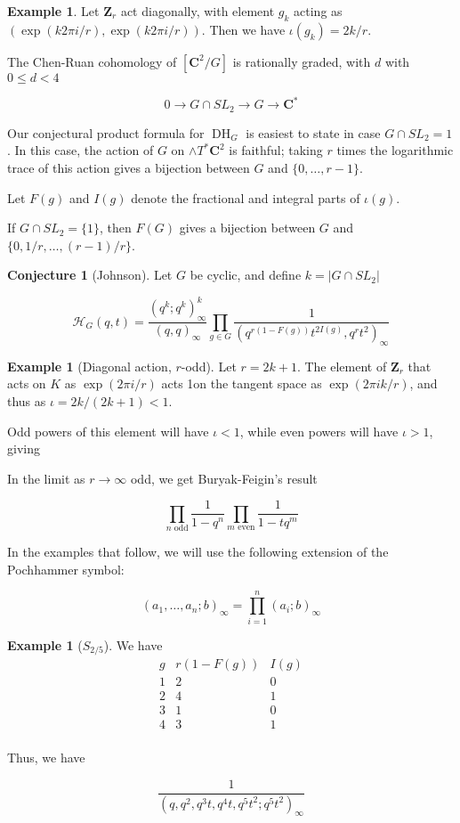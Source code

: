 \documentclass{amsart}[12pt]
\theoremstyle{definition}
\newtheorem{example}[dummy]{Example}
\newtheorem{conjecture}[dummy]{Conjecture}
\newcommand{\Z}{\mathbf{Z}}
\newcommand{\C}{\mathbf{C}}
\DeclareMathOperator{\DC}{DH}
\begin{document}
\begin{example}
Let $\Z_r$ act diagonally, with element $g_k$ acting as $(\exp(k2\pi i/r),\exp(k2\pi i/r))$.  Then we have $\iota(g_k)=2k/r$.
\end{example}




The Chen-Ruan cohomology of $[\C^2/G]$ is rationally graded, with $d$ with $0\leq d < 4$


$$0\to G\cap SL_2\to G \to \C^*$$








Our conjectural product formula for $\DC_G$ is easiest to state in case $G\cap SL_2=1$.  In this case, the action of $G$ on $\wedge T^*\C^2$ is faithful; taking $r$ times the logarithmic trace of this action gives a bijection between $G$ and $\{0,\dots, r-1\}$.


Let $F(g)$ and $I(g)$ denote the fractional and integral parts of $\iota(g)$. 

If $G\cap SL_2=\{1\}$, then $F(G)$ gives a bijection between $G$ and $\{0, 1/r,\dots, (r-1)/r\}$.
\begin{conjecture}[Johnson]
Let $G$ be cyclic, and define $k=|G\cap SL_2|$

$$\mathcal{H}_G(q,t)= \frac{(q^k;q^k)^k_\infty}{(q,q)_\infty} \prod_{g\in G}\frac{1}{(q^{r(1-F(g))} t^{2I(g)},q^rt^2)_\infty}$$

\end{conjecture}


\begin{example}[Diagonal action, $r$-odd]
Let $r=2k+1$.   The element of $\Z_r$ that acts on $K$ as $\exp(2\pi i/r)$ acts 1on the tangent space as $\exp(2\pi i k/r)$, and thus as $\iota=2k/(2k+1)<1$.  

Odd powers of this element will have $\iota<1$, while even powers will have $\iota>1$, giving 

In the limit as $r\to\infty$ odd, we get Buryak-Feigin's result

$$\prod_{n \text{ odd}} \frac{1}{1-q^n}\prod_{m \text{ even}}\frac{1}{1-tq^m}$$
\end{example}

In the examples that follow, we will use the following extension of the Pochhammer symbol:

$$(a_1,\dots, a_n; b)_\infty=\prod_{i=1}^n (a_i;b)_\infty$$

\begin{example}[$S_{2/5}$]
We have
$$\begin{array}{r|c|l}
g & r(1-F(g)) & I(g) \\
\hline
1 & 2 & 0 \\
2 & 4 & 1 \\
3 & 1 & 0 \\
4 & 3 & 1 \\
\end{array}
$$

Thus, we have


$$
\frac{1}{(q, q^2,q^3t, q^4t, q^5t^2; q^5t^2)_\infty}
$$
\end{example}
\end{document}
